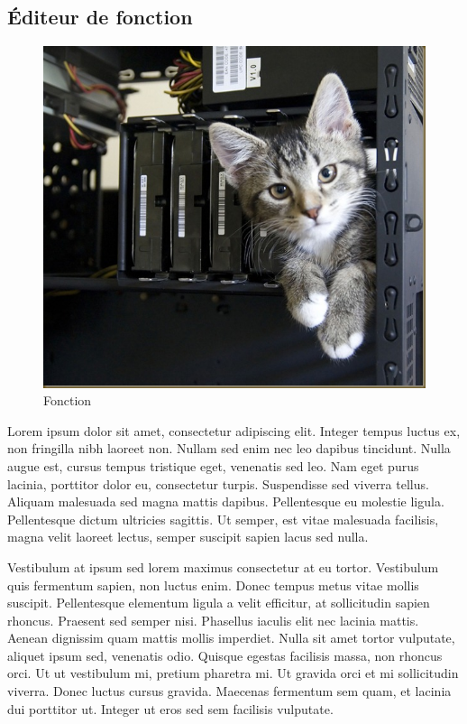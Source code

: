 	\subsection{\'Editeur de fonction}
		\begin{figure}
			\begin{center}
				\includegraphics[width=1\textwidth]{figure/fonction.jpg}
			\end{center}
			\caption{Fonction}
			\label{fig:fonction}
		\end{figure}

		Lorem ipsum dolor sit amet, consectetur adipiscing elit. Integer tempus luctus ex, non fringilla nibh laoreet non. Nullam sed enim nec leo dapibus tincidunt. Nulla augue est, cursus tempus tristique eget, venenatis sed leo. Nam eget purus lacinia, porttitor dolor eu, consectetur turpis. Suspendisse sed viverra tellus. Aliquam malesuada sed magna mattis dapibus. Pellentesque eu molestie ligula. Pellentesque dictum ultricies sagittis. Ut semper, est vitae malesuada facilisis, magna velit laoreet lectus, semper suscipit sapien lacus sed nulla.

		Vestibulum at ipsum sed lorem maximus consectetur at eu tortor. Vestibulum quis fermentum sapien, non luctus enim. Donec tempus metus vitae mollis suscipit. Pellentesque elementum ligula a velit efficitur, at sollicitudin sapien rhoncus. Praesent sed semper nisi. Phasellus iaculis elit nec lacinia mattis. Aenean dignissim quam mattis mollis imperdiet. Nulla sit amet tortor vulputate, aliquet ipsum sed, venenatis odio. Quisque egestas facilisis massa, non rhoncus orci. Ut ut vestibulum mi, pretium pharetra mi. Ut gravida orci et mi sollicitudin viverra. Donec luctus cursus gravida. Maecenas fermentum sem quam, et lacinia dui porttitor ut. Integer ut eros sed sem facilisis vulputate. 

